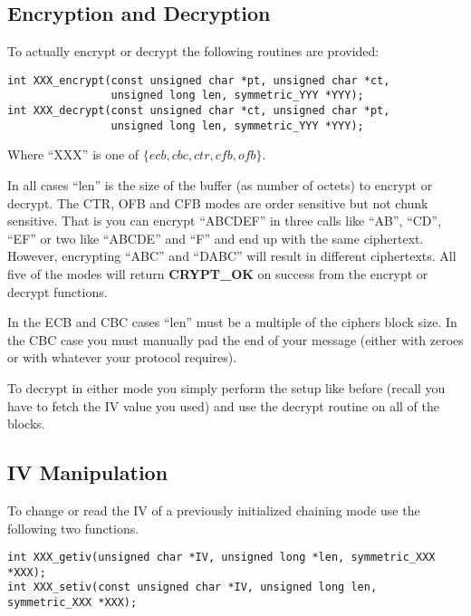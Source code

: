 \documentclass[a4paper]{book}
\begin{document}
\subsection{Encryption and Decryption}
To actually encrypt or decrypt the following routines are provided:
    
     
\begin{verbatim}
int XXX_encrypt(const unsigned char *pt, unsigned char *ct, 
                unsigned long len, symmetric_YYY *YYY);
int XXX_decrypt(const unsigned char *ct, unsigned char *pt, 
                unsigned long len, symmetric_YYY *YYY);
\end{verbatim}
Where ``XXX'' is one of $\lbrace ecb, cbc, ctr, cfb, ofb \rbrace$.  

In all cases ``len'' is the size of the buffer (as number of octets) to encrypt or decrypt.  The CTR, OFB and CFB modes are order sensitive but not
chunk sensitive.  That is you can encrypt ``ABCDEF'' in three calls like ``AB'', ``CD'', ``EF'' or two like ``ABCDE'' and ``F''
and end up with the same ciphertext.  However, encrypting ``ABC'' and ``DABC'' will result in different ciphertexts.  All
five of the modes will return {\bf CRYPT\_OK} on success from the encrypt or decrypt functions.

In the ECB and CBC cases ``len'' must be a multiple of the ciphers block size.  In the CBC case you must manually pad the end of your message (either with
zeroes or with whatever your protocol requires).

To decrypt in either mode you simply perform the setup like before (recall you have to fetch the IV value you used)
and use the decrypt routine on all of the blocks.

\subsection{IV Manipulation}
To change or read the IV of a previously initialized chaining mode use the following two functions.

     
 
\begin{verbatim}
int XXX_getiv(unsigned char *IV, unsigned long *len, symmetric_XXX *XXX);
int XXX_setiv(const unsigned char *IV, unsigned long len, symmetric_XXX *XXX);
\end{verbatim}
\end{document}
